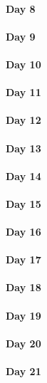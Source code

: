 \documentclass[UTF8,a4paper,8pt]{ctexart}
\begin{document}
 	 \paragraph{Day 8       \quad     }
 	 \paragraph{Day 9       \quad     }
 	 \paragraph{Day 10      \quad     }
 	 \paragraph{Day 11      \quad     }
 	 \paragraph{Day 12      \quad     }
 	 \paragraph{Day 13      \quad     }
 	 \paragraph{Day 14      \quad     }
 	 \paragraph{Day 15      \quad     }
 	 \paragraph{Day 16      \quad     }
 	 \paragraph{Day 17      \quad     }
 	 \paragraph{Day 18      \quad     }
 	 \paragraph{Day 19      \quad     }
 	 \paragraph{Day 20      \quad     }
 	 \paragraph{Day 21      \quad     }
\end{document}
